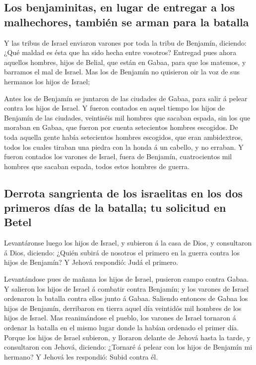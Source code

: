 \hypertarget{los-benjaminitas-en-lugar-de-entregar-a-los-malhechores-tambiuxe9n-se-arman-para-la-batalla}{%
\subsection{Los benjaminitas, en lugar de entregar a los malhechores,
también se arman para la
batalla}\label{los-benjaminitas-en-lugar-de-entregar-a-los-malhechores-tambiuxe9n-se-arman-para-la-batalla}}

 Y las tribus de Israel enviaron varones por toda la
tribu de Benjamín, diciendo: ¿Qué maldad es ésta que ha sido hecha entre
vosotros?  Entregad pues ahora aquellos hombres, hijos de
Belial, que están en Gabaa, para que los matemos, y barramos el mal de
Israel. Mas los de Benjamín no quisieron oir la voz de sus hermanos los
hijos de Israel;

 Antes los de Benjamín se juntaron de las ciudades de
Gabaa, para salir á pelear contra los hijos de Israel.  Y
fueron contados en aquel tiempo los hijos de Benjamín de las ciudades,
veintiséis mil hombres que sacaban espada, sin los que moraban en Gabaa,
que fueron por cuenta setecientos hombres escogidos.  De
toda aquella gente había setecientos hombres escogidos, que eran
ambidextros, todos los cuales tiraban una piedra con la honda á un
cabello, y no erraban.  Y fueron contados los varones de
Israel, fuera de Benjamín, cuatrocientos mil hombres que sacaban espada,
todos estos hombres de guerra.

\hypertarget{derrota-sangrienta-de-los-israelitas-en-los-dos-primeros-duxedas-de-la-batalla-tu-solicitud-en-betel}{%
\subsection{Derrota sangrienta de los israelitas en los dos primeros
días de la batalla; tu solicitud en
Betel}\label{derrota-sangrienta-de-los-israelitas-en-los-dos-primeros-duxedas-de-la-batalla-tu-solicitud-en-betel}}

 Levantáronse luego los hijos de Israel, y subieron á la
casa de Dios, y consultaron á Dios, diciendo: ¿Quién subirá de nosotros
el primero en la guerra contra los hijos de Benjamín? Y Jehová
respondió: Judá el primero.

 Levantándose pues de mañana los hijos de Israel,
pusieron campo contra Gabaa.  Y salieron los hijos de
Israel á combatir contra Benjamín; y los varones de Israel ordenaron la
batalla contra ellos junto á Gabaa.  Saliendo entonces de
Gabaa los hijos de Benjamín, derribaron en tierra aquel día veintidós
mil hombres de los hijos de Israel.  Mas reanimándose el
pueblo, los varones de Israel tornaron á ordenar la batalla en el mismo
lugar donde la habían ordenado el primer día.  Porque los
hijos de Israel subieron, y lloraron delante de Jehová hasta la tarde, y
consultaron con Jehová, diciendo: ¿Tornaré á pelear con los hijos de
Benjamín mi hermano? Y Jehová les respondió: Subid contra él.

